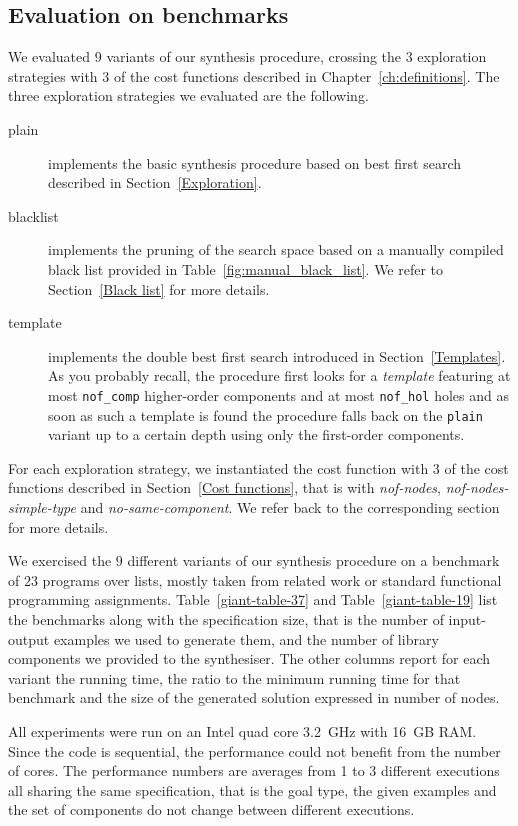 \subsection{Evaluation on benchmarks}\label{Evaluation on benchmarks}
We evaluated $9$ variants of our synthesis procedure, crossing the $3$ exploration strategies with $3$ of the cost functions described in Chapter~\ref{ch:definitions}. The three exploration strategies we evaluated are the following.
\begin{description}
\item[plain] implements the basic synthesis procedure based on best first search described in Section~\ref{Exploration}.
\item[blacklist] implements the pruning of the search space based on a manually compiled black list provided in Table~\ref{fig:manual_black_list}. We refer to Section~\ref{Black list} for more details.
\item[template] implements the double best first search introduced in Section~\ref{Templates}. As you probably recall, the procedure first looks for a \emph{template} featuring at most \lstinline?nof_comp? higher-order components and at most \lstinline?nof_hol? holes and as soon as such a template is found the procedure falls back on the \lstinline?plain? variant up to a certain depth using only the first-order components.
\end{description}
For each exploration strategy, we instantiated the cost function with $3$ of the cost functions described in Section~\ref{Cost functions}, that is with \textit{nof-nodes}, \textit{nof-nodes-simple-type} and \textit{no-same-component}. We refer back to the corresponding section for more details.

We exercised the $9$ different variants of our synthesis procedure on a benchmark of $23$ programs over lists, mostly taken from related work or standard functional programming assignments. Table~\ref{giant-table-37} and Table~\ref{giant-table-19} list the benchmarks along with the specification size, that is the number of input-output examples we used to generate them, and the number of library components we provided to the synthesiser. The other columns report for each variant the running time, the ratio to the minimum running time for that benchmark and the size of the generated solution expressed in number of nodes.

All experiments were run on an Intel quad core 3.2~GHz with 16~GB RAM. Since the code is sequential, the performance could not benefit from the number of cores. The performance numbers are averages from 1 to 3 different executions all sharing the same specification, that is the goal type, the given examples and the set of components do not change between different executions.

